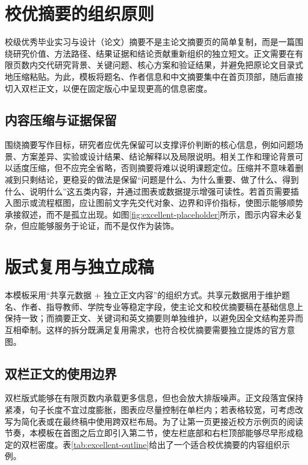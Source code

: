 \section{校优摘要的组织原则}

校级优秀毕业实习与设计（论文）摘要不是主论文摘要页的简单复制，而是一篇围绕研究价值、方法路径、结果证据和结论贡献重新组织的独立短文。正文需要在有限页数内交代研究背景、关键问题、核心方案和验证结果，并避免把原论文目录式地压缩粘贴。为此，模板将题名、作者信息和中文摘要集中在首页顶部，随后直接切入双栏正文，以便在固定版心中呈现更高的信息密度。

\subsection{内容压缩与证据保留}

围绕摘要写作目标，研究者应优先保留可以支撑评价判断的核心信息，例如问题场景、方案差异、实验或设计结果、结论解释以及局限说明。相关工作和理论背景可以适度压缩，但不应完全省略，否则摘要将难以说明课题定位。压缩并不意味着删减到只剩结论，更稳妥的做法是保留“问题是什么、为什么重要、做了什么、得到什么、说明什么”这五类内容，并通过图表或数据提示增强可读性。若首页需要插入图示或流程框图，应让图前文字先交代对象、边界和评价指标，使图示能够顺势承接叙述，而不是孤立出现。如图\ref{fig:excellent-placeholder}所示，图示内容未必复杂，但应能够服务于论证，而不是仅作为装饰\cite{example2026,exampleconf}。

\begin{center}
    \fbox{\rule{0pt}{2.35cm}\rule{0.82\columnwidth}{0pt}}
    \label{fig:excellent-placeholder}
\end{center}

\section{版式复用与独立成稿}

本模板采用“共享元数据 + 独立正文内容”的组织方式。共享元数据用于维护题名、作者、指导教师、学院专业等稳定字段，使主论文和校优摘要稿在基础信息上保持一致；而摘要正文、关键词和英文摘要则单独维护，以避免因全文结构差异而互相牵制。这样的拆分既满足复用需求，也符合校优摘要需要独立提炼的官方意图。

\subsection{双栏正文的使用边界}

双栏版式能够在有限页数内承载更多信息，但也会放大排版噪声。正文段落宜保持紧凑，句子长度不宜过度膨胀，图表应尽量控制在单栏内；若表格较宽，可考虑改写为简化表或在最终稿中使用跨双栏布局。为了让第一页更接近校方示例页的阅读节奏，本模板在首图之后立即引入第二节，使左栏底部和右栏顶部能够尽早形成稳定的双栏密度。表\ref{tab:excellent-outline}给出了一个适合校优摘要的内容组织示例。


